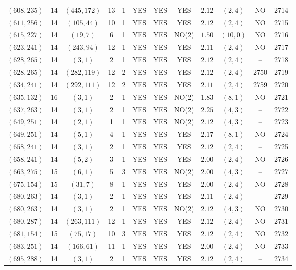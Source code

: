 \begin{longtable}{|c|c|c|c|c|c|c|c|c|c|c|c|}
$(608,235)$ & 14 & $(445,172)$ & 13 & 1 & YES & YES & YES & $2.12$ & $(2,4)$ & NO & 2714\\
$(611,256)$ & 14 & $(105,44)$ & 10 & 1 & YES & YES & YES & $2.12$ & $(2,4)$ & NO & 2715\\
$(615,227)$ & 14 & $(19,7)$ & 6 & 1 & YES & YES & NO(2) & $1.50$ & $(10,0)$ & NO & 2716\\
$(623,241)$ & 14 & $(243,94)$ & 12 & 1 & YES & YES & YES & $2.11$ & $(2,4)$ & NO & 2717\\
$(628,265)$ & 14 & $(3,1)$ & 2 & 1 & YES & YES & YES & $2.12$ & $(2,4)$ & -- & 2718\\
$(628,265)$ & 14 & $(282,119)$ & 12 & 2 & YES & YES & YES & $2.12$ & $(2,4)$ & 2750 & 2719\\
$(634,241)$ & 14 & $(292,111)$ & 12 & 2 & YES & YES & YES & $2.11$ & $(2,4)$ & 2759 & 2720\\
$(635,132)$ & 16 & $(3,1)$ & 2 & 1 & YES & YES & NO(2) & $1.83$ & $(8,1)$ & NO & 2721\\
$(637,263)$ & 14 & $(3,1)$ & 2 & 1 & YES & YES & NO(2) & $2.25$ & $(4,3)$ & -- & 2722\\
$(649,251)$ & 14 & $(2,1)$ & 1 & 1 & YES & YES & NO(2) & $2.12$ & $(4,3)$ & -- & 2723\\
$(649,251)$ & 14 & $(5,1)$ & 4 & 1 & YES & YES & YES & $2.17$ & $(8,1)$ & NO & 2724\\
$(658,241)$ & 14 & $(3,1)$ & 2 & 1 & YES & YES & YES & $2.12$ & $(2,4)$ & -- & 2725\\
$(658,241)$ & 14 & $(5,2)$ & 3 & 1 & YES & YES & YES & $2.00$ & $(2,4)$ & NO & 2726\\
$(663,275)$ & 15 & $(6,1)$ & 5 & 3 & YES & YES & NO(2) & $2.00$ & $(4,3)$ & -- & 2727\\
$(675,154)$ & 15 & $(31,7)$ & 8 & 1 & YES & YES & YES & $2.00$ & $(2,4)$ & NO & 2728\\
$(680,263)$ & 14 & $(3,1)$ & 2 & 1 & YES & YES & YES & $2.11$ & $(2,4)$ & -- & 2729\\
$(680,263)$ & 14 & $(3,1)$ & 2 & 1 & YES & YES & NO(2) & $2.12$ & $(4,3)$ & NO & 2730\\
$(680,287)$ & 14 & $(263,111)$ & 12 & 1 & YES & YES & YES & $2.12$ & $(2,4)$ & NO & 2731\\
$(681,154)$ & 15 & $(75,17)$ & 10 & 3 & YES & YES & YES & $2.12$ & $(2,4)$ & NO & 2732\\
$(683,251)$ & 14 & $(166,61)$ & 11 & 1 & YES & YES & YES & $2.00$ & $(2,4)$ & NO & 2733\\
$(695,288)$ & 14 & $(3,1)$ & 2 & 1 & YES & YES & YES & $2.12$ & $(2,4)$ & -- & 2734\\

\end{longtable}
